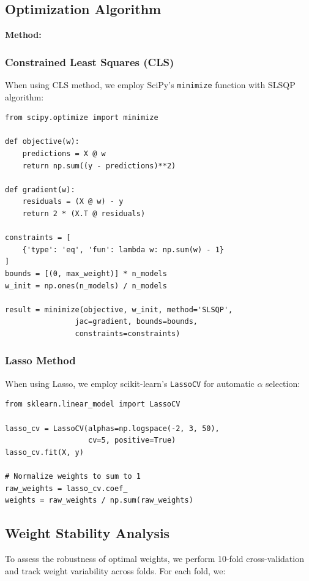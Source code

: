 \subsection{Optimization Algorithm}

\textbf{Method: \ModelElevenMethod{}}

\subsubsection{Constrained Least Squares (CLS)}

When using CLS method, we employ SciPy's \texttt{minimize} function with SLSQP algorithm:

\begin{verbatim}
from scipy.optimize import minimize

def objective(w):
    predictions = X @ w
    return np.sum((y - predictions)**2)

def gradient(w):
    residuals = (X @ w) - y
    return 2 * (X.T @ residuals)

constraints = [
    {'type': 'eq', 'fun': lambda w: np.sum(w) - 1}
]
bounds = [(0, max_weight)] * n_models
w_init = np.ones(n_models) / n_models

result = minimize(objective, w_init, method='SLSQP',
                jac=gradient, bounds=bounds, 
                constraints=constraints)
\end{verbatim}

\subsubsection{Lasso Method}

When using Lasso, we employ scikit-learn's \texttt{LassoCV} for automatic $\alpha$ selection:

\begin{verbatim}
from sklearn.linear_model import LassoCV

lasso_cv = LassoCV(alphas=np.logspace(-2, 3, 50),
                   cv=5, positive=True)
lasso_cv.fit(X, y)

# Normalize weights to sum to 1
raw_weights = lasso_cv.coef_
weights = raw_weights / np.sum(raw_weights)
\end{verbatim}

\subsection{Weight Stability Analysis}

To assess the robustness of optimal weights, we perform 10-fold cross-validation and track weight variability across folds. For each fold, we:

